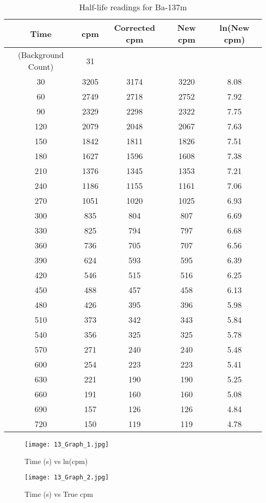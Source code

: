 \documentclass[11pt]{article}
\begin{document}
	\begin{table}[htbp]
		\centering
		\caption{Half-life readings for Ba-137m}
		\begin{tabular}{ccccc}
			\toprule
			Time & cpm & Corrected cpm & New cpm & ln(New cpm) \\
			\midrule
			(Background Count) & 31 &   &   &  \\
			30 & 3205 & 3174 & 3220 & 8.08 \\
			60 & 2749 & 2718 & 2752 & 7.92 \\
			90 & 2329 & 2298 & 2322 & 7.75 \\
			120 & 2079 & 2048 & 2067 & 7.63 \\
			150 & 1842 & 1811 & 1826 & 7.51 \\
			180 & 1627 & 1596 & 1608 & 7.38 \\
			210 & 1376 & 1345 & 1353 & 7.21 \\
			240 & 1186 & 1155 & 1161 & 7.06 \\
			270 & 1051 & 1020 & 1025 & 6.93 \\
			300 & 835 & 804 & 807 & 6.69 \\
			330 & 825 & 794 & 797 & 6.68 \\
			360 & 736 & 705 & 707 & 6.56 \\
			390 & 624 & 593 & 595 & 6.39 \\
			420 & 546 & 515 & 516 & 6.25 \\
			450 & 488 & 457 & 458 & 6.13 \\
			480 & 426 & 395 & 396 & 5.98 \\
			510 & 373 & 342 & 343 & 5.84 \\
			540 & 356 & 325 & 325 & 5.78 \\
			570 & 271 & 240 & 240 & 5.48 \\
			600 & 254 & 223 & 223 & 5.41 \\
			630 & 221 & 190 & 190 & 5.25 \\
			660 & 191 & 160 & 160 & 5.08 \\
			690 & 157 & 126 & 126 & 4.84 \\
			720 & 150 & 119 & 119 & 4.78 \\
			\bottomrule
		\end{tabular}%
		\label{tab:13_Table_1}%
	\end{table}%
	
	\begin{figure}
		\centering
		\begin{minipage}{0.45\textwidth}
			\centering
			\texttt{[image: 13\_Graph\_1.jpg]}
			\caption{\centering Time (s) vs ln(cpm)}
			\label{fig:13_Graph_1}
		\end{minipage}
		\hfill
		\begin{minipage}{0.45\textwidth}
			\centering
			\texttt{[image: 13\_Graph\_2.jpg]}
			\caption{\centering Time (s) vs True cpm}
			\label{fig:13_Graph_2}
		\end{minipage}
	\end{figure}
	
\end{document}
